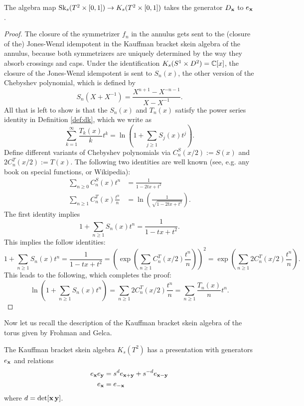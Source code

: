 \begin{lemma}
	The algebra map $\mathrm{Sk}_s(T^2\times [0,1]) \to K_s(T^2\times [0,1])$ takes the generator $D_{\mathbf{x}}$ to  $e_{\mathbf{x}}$.
\end{lemma}
\begin{proof}
The closure of the symmetrizer $f_n$ in the annulus gets sent to the (closure of the) Jones-Wenzl idempotent in the Kauffman bracket skein algebra of the annulus, because both symmetrizers are uniquely determined by the way they absorb crossings and caps. Under the identification $K_s(S^1\times D^2) = \mathbb{C}[x]$, the closure of the Jones-Wenzl idempotent is sent to $S_n(x)$, the other version of the Chebyshev polynomial, which is defined by 
\[S_n(X+X^{-1}) = \frac{X^{n+1}-X^{-n-1}}{X-X^{-1}}.\]
All that is left to show is that the $S_n(x)$ and $T_n(x)$ satisfy the power series identity in Definition \ref{def:dk}, which we write as
\begin{equation*}
\sum_{k=1}^\infty \frac{T_k(x)}{k} t^k =\ln\left(1 + \sum_{j \geq 1} S_j(x) t^j\right).
\end{equation*}	
Define different variants of  Chebyshev polynomials via $C_n^S(x/2):=S(x)$ and $2C_n^T(x/2):=T(x)$. The following two identities are well known (see, e.g. any book on special functions, or Wikipedia):
\begin{align*}
	\sum_{n \geq 0} C_n^S(x)t^n &= \frac{1}{1-2tx+t^2} \\
	\sum_{n \geq 1} C_n^T(x)\frac{t^n}{n} &= \ln \left( \frac{1}{\sqrt{1-2tx+t^2}} \right).
\end{align*}
The first identity implies 
\[
	1+\sum_{n \geq 1} S_n(x)t^n = \frac{1}{1-tx+t^2}.
\]
This implies the follow identities:
\begin{equation*}
	1+\sum_{n \geq 1} S_n(x)t^n  = \frac{1}{1-tx+t^2} = \left( \exp \left( \sum_{n \geq 1} C_n^T(x/2)\frac{t^n}{n} \right) \right)^2
	= \exp \left( \sum_{n \geq 1} 2 C_n^T(x/2)\frac{t^n}{n} \right).
\end{equation*}
This leads to the following, which completes the proof:
\begin{equation*}
\ln \left( 1+\sum_{n \geq 1} S_n(x)t^n \right) = \sum_{n \geq 1} 2 C_n^T(x/2)\frac{t^n}{n} = \sum_{n \geq 1} \frac{T_n(x)}{n} t^n.
\end{equation*} 
\end{proof}

Now let us recall the description of the Kauffman bracket skein algebra of the torus given by Frohman and Gelca.
\begin{theorem}[{\cite{FG00}}]\label{thm:fg}
	The Kauffman bracket skein algebra $K_s(T^2)$ has a presentation with generators $e_{\mathbf{x}}$ and relations
	\begin{align}
	e_{\mathbf{x}} e_{\mathbf{y}} &= s^d e_{{\mathbf{x}} + {\mathbf{y}}} + s^{-d} e_{{\mathbf{x}}-{\mathbf{y}}}\label{eq:fgrel}\\
	e_{{\mathbf{x}}} &= e_{-{\mathbf{x}}}\notag
	\end{align}
	where $d = \det[{\mathbf{x}}\,{\mathbf{y}}]$.
\end{theorem}

